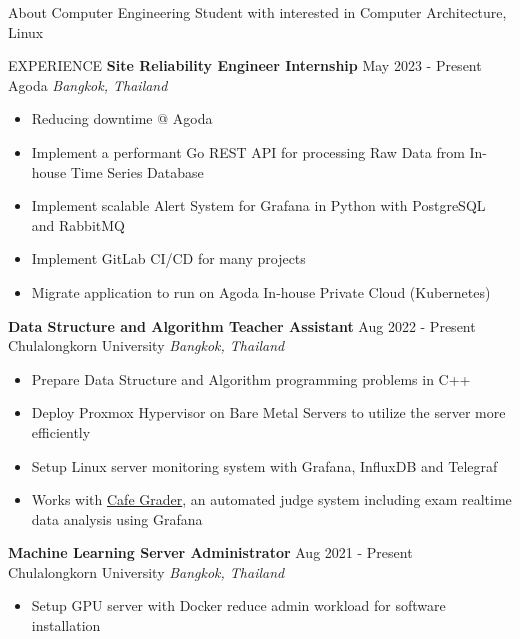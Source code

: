 \documentclass{resume} %
\begin{document}
\begin{rSection}{About}
    {Computer Engineering Student with interested in Computer Architecture, Linux}
\end{rSection}

\begin{rSection}{EXPERIENCE}
    \textbf{Site Reliability Engineer Internship} \hfill May 2023 - Present\\
    Agoda \hfill \textit{Bangkok, Thailand}
    \begin{itemize}
        \item Reducing downtime @ Agoda
        \item Implement a performant Go REST API for processing Raw Data from In-house Time Series Database
        \item Implement scalable Alert System for Grafana in Python with PostgreSQL and RabbitMQ
        \item Implement GitLab CI/CD for many projects
        \item Migrate application to run on Agoda In-house Private Cloud (Kubernetes)
    \end{itemize}
    \textbf{Data Structure and Algorithm Teacher Assistant} \hfill Aug 2022 - Present\\
    Chulalongkorn University \hfill \textit{Bangkok, Thailand}
    \begin{itemize}
        \itemsep -3pt {}
        \item Prepare Data Structure and Algorithm programming problems in C++
        \item Deploy Proxmox Hypervisor on Bare Metal Servers to utilize the server more efficiently
        \item Setup Linux server monitoring system with Grafana, InfluxDB and Telegraf
        \item Works with \href{https://github.com/nattee/cafe-grader-web}{Cafe Grader}, an automated judge system including exam realtime data analysis using Grafana
    \end{itemize}
    \textbf{Machine Learning Server Administrator} \hfill Aug 2021 - Present\\
    Chulalongkorn University \hfill \textit{Bangkok, Thailand}
    \begin{itemize}
        \itemsep -3pt {}
        \item Setup GPU server with Docker reduce admin workload for software installation
    \end{itemize}
\end{rSection}
\end{document}
